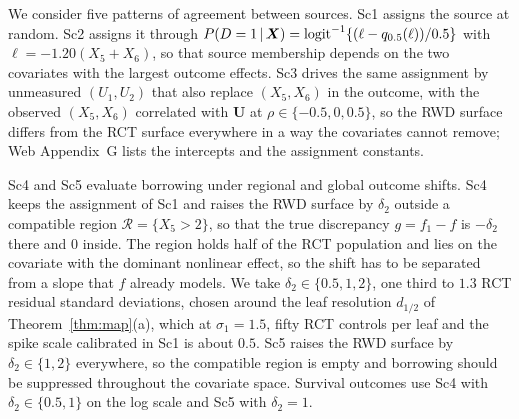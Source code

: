 We consider five patterns of agreement between sources. Sc1 assigns the source at random. Sc2 assigns it through $P(D=1\,\vert\,\bm X)=\mathrm{logit}^{-1}\{(\ell-q_{0.5}(\ell))/0.5\}$ with $\ell=-1.20(X_5+X_6)$, so that source membership depends on the two covariates with the largest outcome effects. Sc3 drives the same assignment by unmeasured $(U_1,U_2)$ that also replace $(X_5,X_6)$ in the outcome, with the observed $(X_5,X_6)$ correlated with $\bm U$ at $\rho\in\{-0.5,0,0.5\}$, so the RWD surface differs from the RCT surface everywhere in a way the covariates cannot remove; Web Appendix~G lists the intercepts and the assignment constants.

Sc4 and Sc5 evaluate borrowing under regional and global outcome shifts. Sc4 keeps the assignment of Sc1 and raises the RWD surface by $\delta_2$ outside a compatible region $\mathcal R=\{X_5>2\}$, so that the true discrepancy $g=f_1-f$ is $-\delta_2$ there and $0$ inside. The region holds half of the RCT population and lies on the covariate with the dominant nonlinear effect, so the shift has to be separated from a slope that $f$ already models. We take $\delta_2\in\{0.5,1,2\}$, one third to $1.3$ RCT residual standard deviations, chosen around the leaf resolution $d_{1/2}$ of Theorem~\ref{thm:map}(a), which at $\sigma_1=1.5$, fifty RCT controls per leaf and the spike scale calibrated in Sc1 is about $0.5$. Sc5 raises the RWD surface by $\delta_2\in\{1,2\}$ everywhere, so the compatible region is empty and borrowing should be suppressed throughout the covariate space. Survival outcomes use Sc4 with $\delta_2\in\{0.5,1\}$ on the log scale and Sc5 with $\delta_2=1$.


